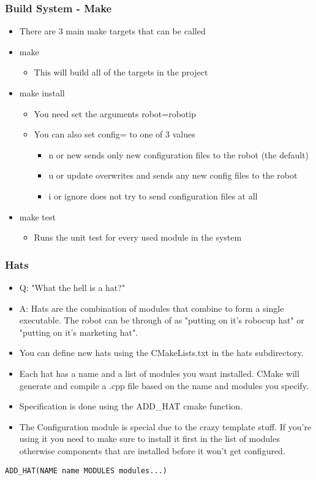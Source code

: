 \documentclass{beamer}
\begin{document}
\begin{frame}
	\frametitle{Build System - Make}
	\begin{itemize}
		\item There are 3 main make targets that can be called
		\item make
		\begin{itemize}
			\item This will build all of the targets in the project
		\end{itemize}
		
		\item make install
		\begin{itemize}
			\item You need set the arguments robot=robotip
			\item You can also set config= to one of 3 values
			\begin{itemize}
				\item n or new sends only new configuration files to the robot (the default)
				\item u or update overwrites and sends any new config files to the robot
				\item i or ignore does not try to send configuration files at all
			\end{itemize}
		\end{itemize}
		
		\item make test
		\begin{itemize}
			\item Runs the unit test for every used module in the system
		\end{itemize}
	\end{itemize}
\end{frame}

\begin{frame}[fragile]
	\frametitle{Hats}
	\begin{itemize}
		\item Q: "What the hell is a hat?"
		\item A: Hats are the combination of modules that combine to form a single executable. 
			The robot can be through of as "putting on it's robocup hat" or "putting on it's marketing hat".
		\item You can define new hats using the CMakeLists.txt in the hats subdirectory.
		\item Each hat has a name and a list of modules you want installed. 
			CMake will generate and compile a .cpp file based on the name and modules you specify.
		\item Specification is done using the ADD\_HAT cmake function.
		\item The Configuration module is special due to the crazy template stuff. If you're using it you
			need to make sure to install it first in the list of modules otherwise components that are installed
			before it won't get configured.
	\end{itemize}

	\begin{lstlisting}[language=nuclear-cmake]
		ADD_HAT(NAME name MODULES modules...)
	\end{lstlisting}
\end{frame}
\end{document}
